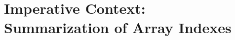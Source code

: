 \documentclass{beamer}
\renewcommand{\emph}[1]{\textcolor{structure}{#1}}
\newcommand{\emp}[1]{\textcolor{DikuRed}{ #1}}
\newcommand{\emphh}[1]{\textcolor{CosGreen}{ #1}}
\newcommand{\mymath}[1]{$ #1 $}
\begin{document}
%
%
%



\section{Imperative Context: Summarization of Array Indexes}
\begin{frame}[fragile]
	\tableofcontents[currentsection]
\end{frame}
\end{document}
